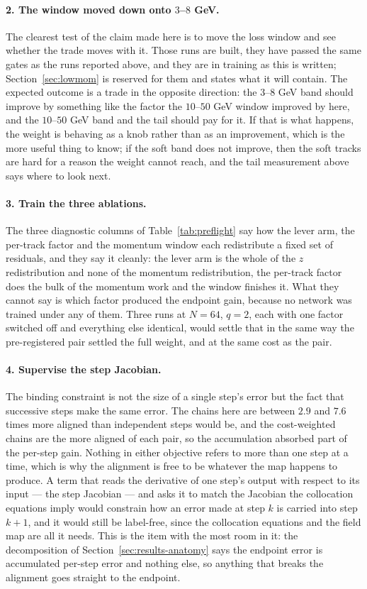 \documentclass[11pt,a4paper]{article}
\begin{document}
\paragraph{2. The window moved down onto $3$--$8$ GeV.} The clearest test of
the claim made here is to move the loss window and see whether the trade moves
with it. Those runs are built, they have passed the same gates as the runs
reported above, and they are in training as this is written;
Section~\ref{sec:lowmom} is reserved for them and states what it will contain.
The expected outcome is a trade in the opposite direction: the $3$--$8$ GeV
band should improve by something like the factor the $10$--$50$ GeV window
improved by here, and the $10$--$50$ GeV band and the tail should pay for it.
If that is what happens, the weight is behaving as a knob rather than as an
improvement, which is the more useful thing to know; if the soft band does not
improve, then the soft tracks are hard for a reason the weight cannot reach,
and the tail measurement above says where to look next.

\paragraph{3. Train the three ablations.} The three diagnostic columns of
Table~\ref{tab:preflight} say how the lever arm, the per-track factor and the
momentum window each redistribute a fixed set of residuals, and they say it
cleanly: the lever arm is the whole of the $z$ redistribution and none of the
momentum redistribution, the per-track factor does the bulk of the momentum
work and the window finishes it. What they cannot say is which factor produced
the endpoint gain, because no network was trained under any of them. Three runs
at $N = 64$, $q = 2$, each with one factor switched off and everything else
identical, would settle that in the same way the pre-registered pair settled the
full weight, and at the same cost as the pair.

\paragraph{4. Supervise the step Jacobian.} The binding constraint is not the
size of a single step's error but the fact that successive steps make the same
error. The chains here are between $2.9$ and $7.6$ times more aligned than
independent steps would be, and the cost-weighted chains are the more aligned
of each pair, so the accumulation absorbed part of the per-step gain. Nothing in
either objective refers to more than one step at a time, which is why the
alignment is free to be whatever the map happens to produce. A term that reads
the derivative of one step's output with respect to its input --- the step
Jacobian --- and asks it to match the Jacobian the collocation equations imply
would constrain how an error made at step $k$ is carried into step $k+1$, and
it would still be label-free, since the collocation equations and the field map
are all it needs. This is the item with the most room in it: the decomposition
of Section~\ref{sec:results-anatomy} says the endpoint error is accumulated
per-step error and nothing else, so anything that breaks the alignment goes
straight to the endpoint.
\end{document}
